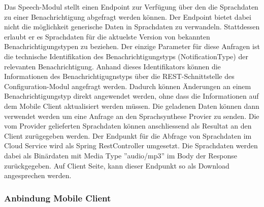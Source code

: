 Das Speech-Modul stellt einen Endpoint zur Verfügung über den die Sprachdaten zu einer Benachrichtigung abgefragt werden können.
Der Endpoint bietet dabei nicht die möglichkeit generische Daten in Sprachdaten zu verwandeln.
Stattdessen erlaubt er es Sprachdaten für die aktuelste Version von bekannten Benachrichtigungstypen zu beziehen.
Der einzige Parameter für diese Anfragen ist die technische Identifikation des Benachrichtigungstyps (NotificationType) der relevanten Benachrichtigung.
Anhand dieses Identifikators können die Informationen des Benachrichtigugnstyps über die REST-Schnittstelle des Configuration-Modul angefragt werden.
Dadurch können Änderungen an einem Benachrichtigungstyp direkt angewendet werden, ohne dass die Informationen auf dem Mobile Client aktualisiert werden müssen.
Die geladenen Daten können dann verwendet werden um eine Anfrage an den Sprachsynthese Provier zu senden.
Die vom Provider gelieferten Sprachdaten können anschliessend als Resultat an den Client zurügegeben werden.
Der Endpunkt für die Abfrage von Sprachdaten im Cloud Service wird als Spring RestController umgesetzt.
Die Sprachdaten werden dabei als Binärdaten mit Media Type ''audio/mp3'' im Body der Response zurückgegeben.
Auf Client Seite, kann dieser Endpunkt so als Download angesprechen werden.

\clearpage
\subsubsection{Anbindung Mobile Client}

